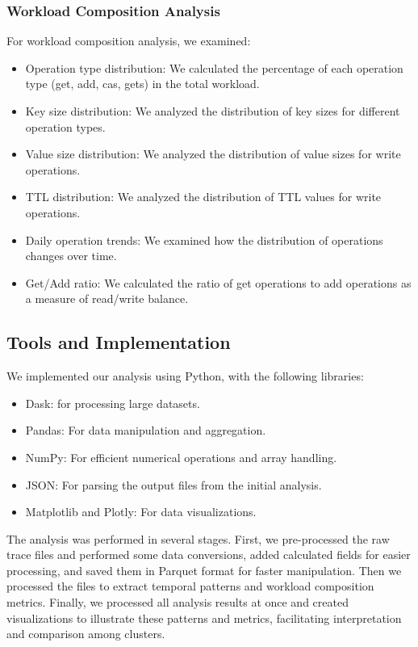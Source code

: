 \documentclass[conference]{IEEEtran}
\begin{document}
\subsubsection{Workload Composition Analysis}
For workload composition analysis, we examined:
\begin{itemize}
    \item Operation type distribution: We calculated the percentage of each operation type (get, add, cas, gets) in the total workload.
    \item Key size distribution: We analyzed the distribution of key sizes for different operation types.
    \item Value size distribution: We analyzed the distribution of value sizes for write operations.
    \item TTL distribution: We analyzed the distribution of TTL values for write operations.
    \item Daily operation trends: We examined how the distribution of operations changes over time.
    \item Get/Add ratio: We calculated the ratio of get operations to add operations as a measure of read/write balance.
\end{itemize}

\subsection{Tools and Implementation}
We implemented our analysis using Python, with the following libraries:
\begin{itemize}
    \item Dask: for processing large datasets.
    \item Pandas: For data manipulation and aggregation.
    \item NumPy: For efficient numerical operations and array handling.
    \item JSON: For parsing the output files from the initial analysis.
    \item Matplotlib and Plotly: For data visualizations.
\end{itemize}

The analysis was performed in several stages. First, we pre-processed the raw trace files and performed some data conversions, added calculated fields for easier processing, and saved them in Parquet format for faster manipulation. Then we processed the files to extract temporal patterns and workload composition metrics. Finally, we processed all analysis results at once and created visualizations to illustrate these patterns and metrics, facilitating interpretation and comparison among clusters.
\end{document}
